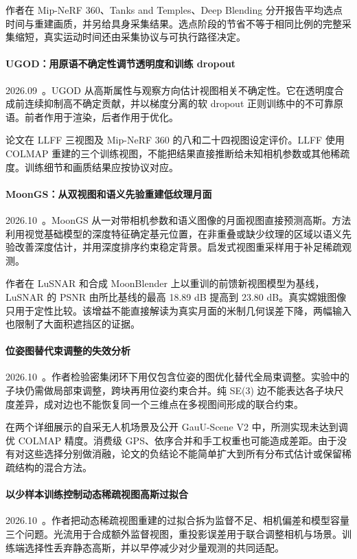 作者在 Mip-NeRF 360、Tanks and Temples、Deep Blending 分开报告平均选点时间与重建画质，并另给具身采集结果。选点阶段的节省不等于相同比例的完整采集缩短，真实运动时间还由采集协议与可执行路径决定。

\paragraph{UGOD：用原语不确定性调节透明度和训练 dropout}
2026.09~\cite{2609_39089}。UGOD 从高斯属性与观察方向估计视图相关不确定性。它在透明度合成前连续抑制高不确定贡献，并以梯度分离的软 dropout 正则训练中的不可靠原语。前者作用于渲染，后者作用于优化。

论文在 LLFF 三视图及 Mip-NeRF 360 的八和二十四视图设定评价。LLFF 使用 COLMAP 重建的三个训练视图，不能把结果直接推断给未知相机参数或其他稀疏度。训练细节和画质结果应按协议对应。

\paragraph{MoonGS：从双视图和语义先验重建低纹理月面}
2026.10~\cite{2610_07110}。MoonGS 从一对带相机参数和语义图像的月面视图直接预测高斯。方法利用视觉基础模型的深度特征确定基元位置，在非重叠或缺少纹理的区域以语义先验改善深度估计，并用深度排序约束稳定背景。启发式视图重采样用于补足稀疏观测。

作者在 LuSNAR 和合成 MoonBlender 上以重训的前馈新视图模型为基线，LuSNAR 的 PSNR 由所比基线的最高 18.89 dB 提高到 23.80 dB。真实嫦娥图像只用于定性比较。该增益不能直接解读为真实月面的米制几何误差下降，两幅输入也限制了大面积遮挡区的证据。

\paragraph{位姿图替代束调整的失效分析}
2026.10~\cite{2610_14090}。作者检验密集闭环下用仅包含位姿的图优化替代全局束调整。实验中的子块仍需做局部束调整，跨块再用位姿约束合并。纯 SE(3) 边不能表达各子块尺度差异，成对边也不能恢复同一个三维点在多视图间形成的联合约束。

在两个详细展示的自采无人机场景及公开 GauU-Scene V2 中，所测实现未达到调优 COLMAP 精度。消费级 GPS、依序合并和手工权重也可能造成差距。由于没有对这些选择分别做消融，论文的负结论不能简单扩大到所有分布式估计或保留稀疏结构的混合方法。

\paragraph{以少样本训练控制动态稀疏视图高斯过拟合}
2026.10~\cite{2610_25887}。作者把动态稀疏视图重建的过拟合拆为监督不足、相机偏差和模型容量三个问题。光流用于合成额外监督视图，重投影误差用于联合调整相机与场景。训练端选择性丢弃静态高斯，并以早停减少对少量观测的共同适配。

